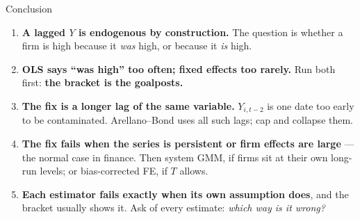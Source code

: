 \documentclass[
  11pt,
  ignorenonframetext,
  aspectratio=169,
]{beamer}
\providecommand{\tightlist}{%
  \setlength{\itemsep}{0pt}\setlength{\parskip}{0pt}}
\begin{document}
\begin{frame}{Conclusion}
\protect{}\label{conclusion}
\begin{enumerate}
\tightlist
\item
  \textbf{A lagged \(Y\) is endogenous by construction.} The question is
  whether a firm is high because it \emph{was} high, or because it
  \emph{is} high.
\item
  \textbf{OLS says ``was high'' too often; fixed effects too rarely.}
  Run both first: \textbf{the bracket is the goalposts.}
\item
  \textbf{The fix is a longer lag of the same variable.} \(Y_{i,t-2}\)
  is one date too early to be contaminated. Arellano--Bond uses all such
  lags; cap and collapse them.
\item
  \textbf{The fix fails when the series is persistent or firm effects
  are large} --- the normal case in finance. Then system GMM, if firms
  sit at their own long-run levels; or bias-corrected FE, if \(T\)
  allows.
\item
  \textbf{Each estimator fails exactly when its own assumption does},
  and the bracket usually shows it. Ask of every estimate: \emph{which
  way is it wrong?}
\end{enumerate}
\end{frame}
\end{document}
